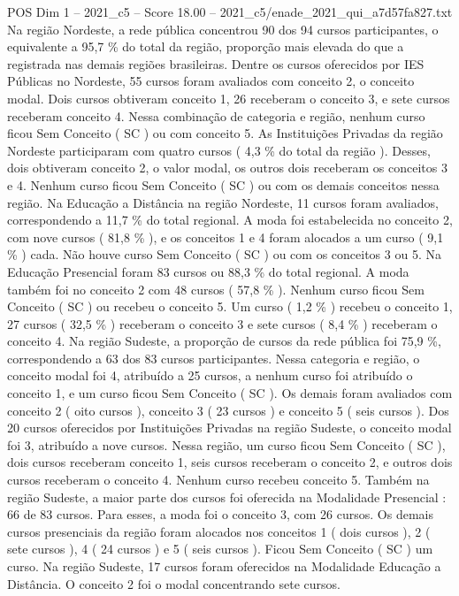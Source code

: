 \begin{textsample}{POS Dim 1 – 2021\_c5 – Score 18.00 – 2021\_c5/enade\_2021\_qui\_a7d57fa827.txt}
Na região Nordeste, a rede pública concentrou 90 dos 94 cursos participantes, o equivalente a 95,7 \% do total da região, proporção mais elevada do que a registrada nas demais regiões brasileiras.
Dentre os cursos oferecidos por IES Públicas no Nordeste, 55 cursos foram avaliados com conceito 2, o conceito modal.
Dois cursos obtiveram conceito 1, 26 receberam o conceito 3, e sete cursos receberam conceito 4.
Nessa combinação de categoria e região, nenhum curso ficou Sem Conceito ( SC ) ou com conceito 5.
As Instituições Privadas da região Nordeste participaram com quatro cursos ( 4,3 \% do total da região ).
Desses, dois obtiveram conceito 2, o valor modal, os outros dois receberam os conceitos 3 e 4.
Nenhum curso ficou Sem Conceito ( SC ) ou com os demais conceitos nessa região.
Na Educação a Distância na região Nordeste, 11 cursos foram avaliados, correspondendo a 11,7 \% do total regional.
A moda foi estabelecida no conceito 2, com nove cursos ( 81,8 \% ), e os conceitos 1 e 4 foram alocados a um curso ( 9,1 \% ) cada.
Não houve curso Sem Conceito ( SC ) ou com os conceitos 3 ou 5.
Na Educação Presencial foram 83 cursos ou 88,3 \% do total regional.
A moda também foi no conceito 2 com 48 cursos ( 57,8 \% ).
Nenhum curso ficou Sem Conceito ( SC ) ou recebeu o conceito 5.
Um curso ( 1,2 \% ) recebeu o conceito 1, 27 cursos ( 32,5 \% ) receberam o conceito 3 e sete cursos ( 8,4 \% ) receberam o conceito 4.
Na região Sudeste, a proporção de cursos da rede pública foi 75,9 \%, correspondendo a 63 dos 83 cursos participantes.
Nessa categoria e região, o conceito modal foi 4, atribuído a 25 cursos, a nenhum curso foi atribuído o conceito 1, e um curso ficou Sem Conceito ( SC ).
Os demais foram avaliados com conceito 2 ( oito cursos ), conceito 3 ( 23 cursos ) e conceito 5 ( seis cursos ).
Dos 20 cursos oferecidos por Instituições Privadas na região Sudeste, o conceito modal foi 3, atribuído a nove cursos.
Nessa região, um curso ficou Sem Conceito ( SC ), dois cursos receberam conceito 1, seis cursos receberam o conceito 2, e outros dois cursos receberam o conceito 4.
Nenhum curso recebeu conceito 5.
Também na região Sudeste, a maior parte dos cursos foi oferecida na Modalidade Presencial : 66 de 83 cursos.
Para esses, a moda foi o conceito 3, com 26 cursos.
Os demais cursos presenciais da região foram alocados nos conceitos 1 ( dois cursos ), 2 ( sete cursos ), 4 ( 24 cursos ) e 5 ( seis cursos ).
Ficou Sem Conceito ( SC ) um curso.
Na região Sudeste, 17 cursos foram oferecidos na Modalidade Educação a Distância.
O conceito 2 foi o modal concentrando sete cursos.

\end{textsample}
